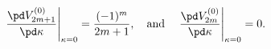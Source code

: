 \begin{equation}
\left.\frac{\pd V_{2m+1}^{(0)}}{\pd\kappa}\right|_{\kappa=0}=
\frac{(-1)^m}{2m+1},\quad\text{and}\quad
\left.\frac{\pd V_{2m}^{(0)}}{\pd\kappa}\right|_{\kappa=0}=0.
\label{C4.5}
\end{equation}


